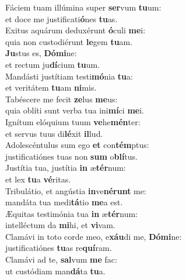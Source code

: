 \oddverse Fáciem tuam illúmina super \textbf{ser}vum \textbf{tu}um:~\*\\
\oddverse et doce me justificati\textbf{ó}nes \textbf{tu}as.\\
\evenverse Exitus aquárum deduxérunt \textbf{ó}culi \textbf{me}i:~\*\\
\evenverse quia non custodiérunt \textbf{le}gem \textbf{tu}am.\\
\oddverse \textbf{Ju}stus es, \textbf{Dó}\textbf{mi}ne:~\*\\
\oddverse et rectum ju\textbf{dí}cium \textbf{tu}um.\\
\evenverse Mandásti justítiam testi\textbf{mó}nia \textbf{tu}a:~\*\\
\evenverse et veritátem \textbf{tu}am \textbf{ni}mis.\\
\oddverse Tabéscere me fecit \textbf{ze}lus \textbf{me}us:~\*\\
\oddverse quia oblíti sunt verba tua ini\textbf{mí}ci \textbf{me}i.\\
\evenverse Ignítum elóquium tuum \textbf{ve}he\textbf{mén}ter:~\*\\
\evenverse et servus tuus di\textbf{lé}xit \textbf{il}lud.\\
\oddverse Adolescéntulus sum ego \textbf{et} con\textbf{tém}ptus:~\*\\
\oddverse justificatiónes tuas non \textbf{sum} o\textbf{blí}tus.\\
\evenverse Justítia tua, justítia \textbf{in} æ\textbf{tér}num:~\*\\
\evenverse et lex \textbf{tu}a \textbf{vé}ritas.\\
\oddverse Tribulátio, et angústia \textbf{in}ve\textbf{né}\textbf{runt} me:~\*\\
\oddverse mandáta tua medi\textbf{tá}tio \textbf{me}a est.\\
\evenverse Æquitas testimónia tua \textbf{in} æ\textbf{tér}num:~\*\\
\evenverse intelléctum da \textbf{mi}hi, et \textbf{vi}vam.\\
\oddverse Clamávi in toto corde meo, e\textbf{xáu}di me, \textbf{Dó}\textbf{mi}ne:~\*\\
\oddverse justificatiónes \textbf{tu}as re\textbf{quí}ram.\\
\evenverse Clamávi ad te, \textbf{sal}vum \textbf{me} fac:~\*\\
\evenverse ut custódiam man\textbf{dá}ta \textbf{tu}a.\\
